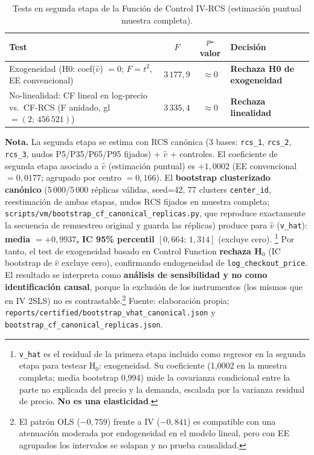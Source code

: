 \documentclass[doc, a4paper, biblatex, floatsintext, longtable, babel]{apa7}
\begin{document}
\begin{table}[!htbp]
\centering
\caption{Tests en segunda etapa de la Función de Control IV-RCS (estimación puntual muestra completa).}
\label{tab:control_function_tests}
\begin{tabular}{@{}p{7.2cm}ccp{3.6cm}@{}}
\toprule
Test & $F$ & $p$-valor & Decisión \\
\midrule
Exogeneidad (H0: coef($\hat{v}$) $=0$; $F=t^2$, EE convencional) & $3\,177,9$ & $\approx 0$ & \textbf{Rechaza H0 de exogeneidad} \\
No-linealidad: CF lineal en log-precio vs.\ CF-RCS (F anidado, gl $=(2;\,456\,521)$) & $3\,335,4$ & $\approx 0$ & \textbf{Rechaza linealidad} \\
\bottomrule
\end{tabular}
\end{table}

\textbf{Nota.} La segunda etapa se estima con RCS canónica (3 bases: \texttt{rcs\_1}, \texttt{rcs\_2}, \texttt{rcs\_3}, nudos P5/P35/P65/P95 fijados) + $\hat{v}$ + controles. El coeficiente de segunda etapa asociado a $\hat{v}$ (estimación puntual) es $+1,0002$ (EE convencional $=0,0177$; agrupado por centro $=0,166$). El \textbf{bootstrap clusterizado canónico} (5\,000/5\,000 réplicas válidas, seed=42, 77 clusters \texttt{center\_id}, reestimación de ambas etapas, nudos RCS fijados en muestra completa; \texttt{scripts/vm/bootstrap\_cf\_canonical\_replicas.py}, que reproduce exactamente la secuencia de remuestreo original y guarda las réplicas) produce para $\hat{v}$ (\texttt{v\_hat}): \textbf{media $= +0,9937$, IC 95\% percentil $[0,664;\,1,314]$} (excluye cero). \footnote{\texttt{v\_hat} es el residual de la primera etapa incluido como regresor en la segunda etapa para testear H$_0$: exogeneidad. Su coeficiente (1,0002 en la muestra completa; media bootstrap 0,994) mide la covarianza condicional entre la parte no explicada del precio y la demanda, escalada por la varianza residual de precio. \textbf{No es una elasticidad}.} Por tanto, el test de exogeneidad basado en Control Function \textbf{rechaza H$_0$} (IC bootstrap de $\hat{v}$ excluye cero), confirmando endogeneidad de \texttt{log\_checkout\_price}. El resultado se interpreta como \textbf{análisis de sensibilidad y no como identificación causal}, porque la exclusión de los instrumentos (los mismos que en IV 2SLS) no es contrastable.\footnote{El patrón OLS ($-0,759$) frente a IV ($-0,841$) es compatible con una atenuación moderada por endogeneidad en el modelo lineal, pero con EE agrupados los intervalos se solapan y no prueba causalidad.} Fuente: elaboración propia; \texttt{reports/certified/bootstrap\_vhat\_canonical.json} y \texttt{bootstrap\_cf\_canonical\_replicas.json}.
\end{document}
